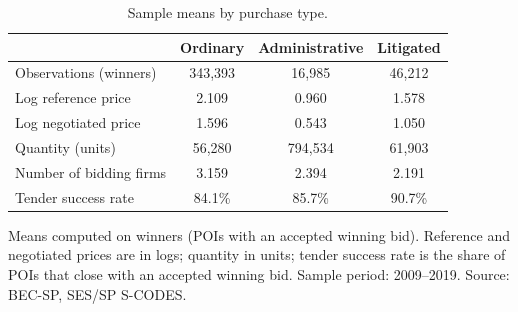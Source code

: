 \begin{table}[ht]
\centering
\caption{Sample means by purchase type.}
\label{tab:descriptive_balance}
\begin{threeparttable}
\begin{tabular}{lccc}
\toprule
 & Ordinary & Administrative & Litigated \\
\midrule
Observations (winners) & 343{,}393 & 16{,}985 & 46{,}212 \\
Log reference price & 2.109 & 0.960 & 1.578 \\
Log negotiated price & 1.596 & 0.543 & 1.050 \\
Quantity (units) & 56{,}280 & 794{,}534 & 61{,}903 \\
Number of bidding firms & 3.159 & 2.394 & 2.191 \\
Tender success rate & 84.1\% & 85.7\% & 90.7\% \\
\bottomrule
\end{tabular}
\begin{tablenotes}[flushleft]\footnotesize
\item Means computed on winners (POIs with an accepted winning bid). Reference and negotiated prices are in logs; quantity in units; tender success rate is the share of POIs that close with an accepted winning bid. Sample period: 2009--2019. Source: BEC-SP, SES/SP S-CODES.
\end{tablenotes}
\end{threeparttable}
\end{table}
